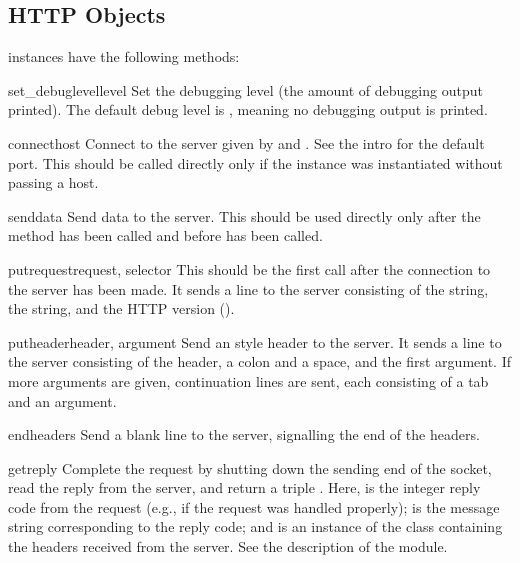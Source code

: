 \subsection{HTTP Objects}

 instances have the following methods:


\begin{methoddesc}{set_debuglevel}{level}
Set the debugging level (the amount of debugging output printed).
The default debug level is , meaning no debugging output is
printed.
\end{methoddesc}

\begin{methoddesc}{connect}{host}
Connect to the server given by  and .  See the
intro for the default port.  This should be called directly only if
the instance was instantiated without passing a host.
\end{methoddesc}

\begin{methoddesc}{send}{data}
Send data to the server.  This should be used directly only after the
 method has been called and before
 has been called.
\end{methoddesc}

\begin{methoddesc}{putrequest}{request, selector}
This should be the first call after the connection to the server has
been made.  It sends a line to the server consisting of the
 string, the  string, and the HTTP version
().
\end{methoddesc}

\begin{methoddesc}{putheader}{header, argument}
Send an  style header to the server.  It sends a line to the
server consisting of the header, a colon and a space, and the first
argument.  If more arguments are given, continuation lines are sent,
each consisting of a tab and an argument.
\end{methoddesc}

\begin{methoddesc}{endheaders}{}
Send a blank line to the server, signalling the end of the headers.
\end{methoddesc}

\begin{methoddesc}{getreply}{}
Complete the request by shutting down the sending end of the socket,
read the reply from the server, and return a triple
.  Here,
 is the integer reply code from the request (e.g.,
 if the request was handled properly);  is the
message string corresponding to the reply code; and  is
an instance of the class  containing the
headers received from the server.  See the description of the
 module.
\end{methoddesc}

